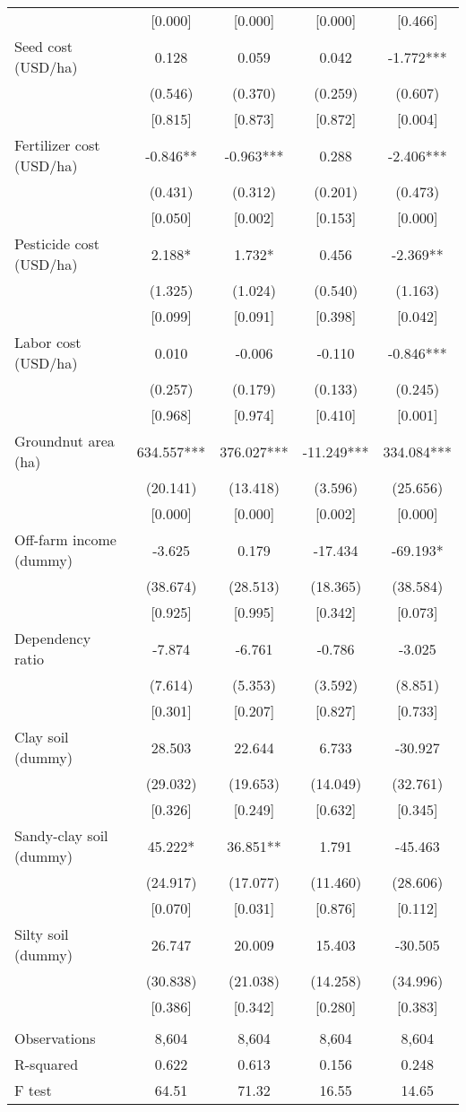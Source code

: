 \documentclass[]{article}
\begin{document}
\begin{tabular}{lcccc}
 & [0.000] & [0.000] & [0.000] & [0.466] \\
Seed cost (USD/ha) & 0.128 & 0.059 & 0.042 & -1.772*** \\
 & (0.546) & (0.370) & (0.259) & (0.607) \\
 & [0.815] & [0.873] & [0.872] & [0.004] \\
Fertilizer cost (USD/ha) & -0.846** & -0.963*** & 0.288 & -2.406*** \\
 & (0.431) & (0.312) & (0.201) & (0.473) \\
 & [0.050] & [0.002] & [0.153] & [0.000] \\
Pesticide cost (USD/ha) & 2.188* & 1.732* & 0.456 & -2.369** \\
 & (1.325) & (1.024) & (0.540) & (1.163) \\
 & [0.099] & [0.091] & [0.398] & [0.042] \\
Labor cost (USD/ha) & 0.010 & -0.006 & -0.110 & -0.846*** \\
 & (0.257) & (0.179) & (0.133) & (0.245) \\
 & [0.968] & [0.974] & [0.410] & [0.001] \\
Groundnut area (ha) & 634.557*** & 376.027*** & -11.249*** & 334.084*** \\
 & (20.141) & (13.418) & (3.596) & (25.656) \\
 & [0.000] & [0.000] & [0.002] & [0.000] \\
Off-farm income (dummy) & -3.625 & 0.179 & -17.434 & -69.193* \\
 & (38.674) & (28.513) & (18.365) & (38.584) \\
 & [0.925] & [0.995] & [0.342] & [0.073] \\
Dependency ratio & -7.874 & -6.761 & -0.786 & -3.025 \\
 & (7.614) & (5.353) & (3.592) & (8.851) \\
 & [0.301] & [0.207] & [0.827] & [0.733] \\
Clay soil (dummy) & 28.503 & 22.644 & 6.733 & -30.927 \\
 & (29.032) & (19.653) & (14.049) & (32.761) \\
 & [0.326] & [0.249] & [0.632] & [0.345] \\
Sandy-clay soil (dummy) & 45.222* & 36.851** & 1.791 & -45.463 \\
 & (24.917) & (17.077) & (11.460) & (28.606) \\
 & [0.070] & [0.031] & [0.876] & [0.112] \\
Silty soil (dummy) & 26.747 & 20.009 & 15.403 & -30.505 \\
 & (30.838) & (21.038) & (14.258) & (34.996) \\
 & [0.386] & [0.342] & [0.280] & [0.383] \\
 &  &  &  &  \\
Observations & 8,604 & 8,604 & 8,604 & 8,604 \\
R-squared & 0.622 & 0.613 & 0.156 & 0.248 \\
 F test & 64.51 & 71.32 & 16.55 & 14.65 \\ \hline
\end{tabular}
\end{document}
